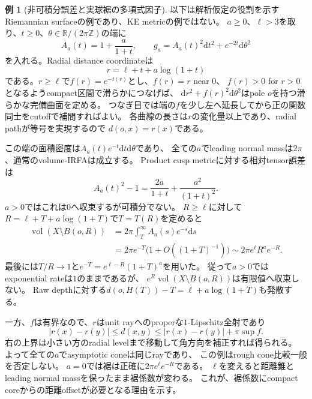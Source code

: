 \documentclass[11pt,a4paper]{ltjsarticle}
\newcommand{\RR}{\mathbb R}
\newcommand{\ZZ}{\mathbb Z}
\newcommand{\dd}{\mathrm d}
\newcommand{\vol}{\operatorname{vol}}
\theoremstyle{plain}
\theoremstyle{definition}
\newtheorem{example}[example]{例}
\theoremstyle{remark}
\begin{document}
\begin{example}[非可積分誤差と実球裾の多項式因子]
\label{ex:nonintegrable-cusp-tail}
以下は解析仮定の役割を示すRiemannian surfaceの例であり、KE metricの例ではない。
$a\ge0$、$\ell>3$を取り、$t\ge0$、$\theta\in\RR/(2\pi\ZZ)$の端に
\[
 A_a(t)=1+\frac{a}{1+t},\qquad
 g_a=A_a(t)^2\dd t^2+e^{-2t}\dd\theta^2
\]
を入れる。Radial distance coordinateは
\[
 r=\ell+t+a\log(1+t)
\]
である。$r\ge\ell$で$f(r)=e^{-t(r)}$とし、$f(r)=r$ near $0$、
$f(r)>0$ for $r>0$となるようcompact区間で滑らかにつなげば、
$\dd r^2+f(r)^2\dd\theta^2$はpole $o$を持つ滑らかな完備曲面を定める。
つなぎ目では端の$f$を少し左へ延長してから正の関数同士をcutoffで補間すればよい。
各曲線の長さは$r$の変化量以上であり、radial pathが等号を実現するので
$d(o,x)=r(x)$である。

この端の面積密度は$A_a(t)e^{-t}\dd t\dd\theta$であり、
全ての$a$でleading normal massは$2\pi$、通常のvolume-IRFAは成立する。
Product cusp metricに対する相対tensor誤差は
\[
 A_a(t)^2-1=\frac{2a}{1+t}+\frac{a^2}{(1+t)^2}.
\]
$a>0$ではこれは$0$へ収束するが可積分でない。
$R\ge\ell$に対して$R=\ell+T+a\log(1+T)$で$T=T(R)$を定めると
\begin{align*}
 \vol(X\setminus B(o,R))
 &=2\pi\int_T^\infty A_a(s)e^{-s}\dd s\\
 &=2\pi e^{-T}\bigl(1+O((1+T)^{-1})\bigr)
 \sim 2\pi e^\ell R^a e^{-R}.
\end{align*}
最後には$T/R\to1$と$e^{-T}=e^{\ell-R}(1+T)^a$を用いた。
従って$a>0$ではexponential rateは$1$のままであるが、
$e^R\vol(X\setminus B(o,R))$は有限値へ収束しない。
Raw depthに対する$d(o,H(T))-T=\ell+a\log(1+T)$も発散する。

一方、$f$は有界なので、$r$はunit rayへのproperな$1$-Lipschitz全射であり
\[
 |r(x)-r(y)|\le d(x,y)
 \le |r(x)-r(y)|+\pi\sup f.
\]
右の上界は小さい方のradial levelまで移動して角方向を補正すれば得られる。
よって全ての$a$でasymptotic coneは同じrayであり、
この例はrough cone比較一般を否定しない。
$a=0$では裾は正確に$2\pi e^\ell e^{-R}$である。
$\ell$を変えると距離錐とleading normal massを保ったまま裾係数が変わる。
これが、裾係数にcompact coreからの距離offsetが必要となる理由を示す。
\end{example}
\end{document}
